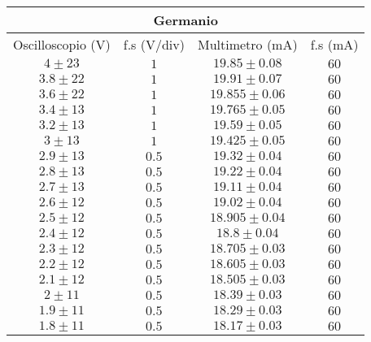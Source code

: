 \documentclass[@MAIN@]{subfile}
\begin{document}
    \begin{tabular}{ ||c|c|c|c|| }
        \hline
        \multicolumn{4}{||c||}{Germanio} \\
        \hline
        Oscilloscopio (V) & f.s (V/div) & Multimetro (mA)   & f.s (mA) \\
        \hline
        $4\pm 23$         & $1$         & $19.85\pm 0.08$   & $60$     \\
        \hline
        $3.8\pm 22$       & $1$         & $19.91\pm 0.07$   & $60$     \\
        \hline
        $3.6\pm 22$       & $1$         & $19.855\pm 0.06$  & $60$     \\
        \hline
        $3.4\pm 13$       & $1$         & $19.765\pm 0.05$  & $60$     \\
        \hline
        $3.2\pm 13$       & $1$         & $19.59\pm 0.05$   & $60$     \\
        \hline
        $3\pm 13$         & $1$         & $19.425\pm 0.05$  & $60$     \\
        \hline
        $2.9\pm 13$       & $0.5$       & $19.32\pm 0.04$   & $60$     \\
        \hline
        $2.8\pm 13$       & $0.5$       & $19.22\pm 0.04$   & $60$     \\
        \hline
        $2.7\pm 13$       & $0.5$       & $19.11\pm 0.04$   & $60$     \\
        \hline
        $2.6\pm 12$       & $0.5$       & $19.02\pm 0.04$   & $60$     \\
        \hline
        $2.5\pm 12$       & $0.5$       & $18.905\pm 0.04$  & $60$     \\
        \hline
        $2.4\pm 12$       & $0.5$       & $18.8\pm 0.04$    & $60$     \\
        \hline
        $2.3\pm 12$       & $0.5$       & $18.705\pm 0.03$  & $60$     \\
        \hline
        $2.2\pm 12$       & $0.5$       & $18.605\pm 0.03$  & $60$     \\
        \hline
        $2.1\pm 12$       & $0.5$       & $18.505\pm 0.03$  & $60$     \\
        \hline
        $2\pm 11$         & $0.5$       & $18.39\pm 0.03$   & $60$     \\
        \hline
        $1.9\pm 11$       & $0.5$       & $18.29\pm 0.03$   & $60$     \\
        \hline
        $1.8\pm 11$       & $0.5$       & $18.17\pm 0.03$   & $60$     \\

\end{tabular}
\end{document}

